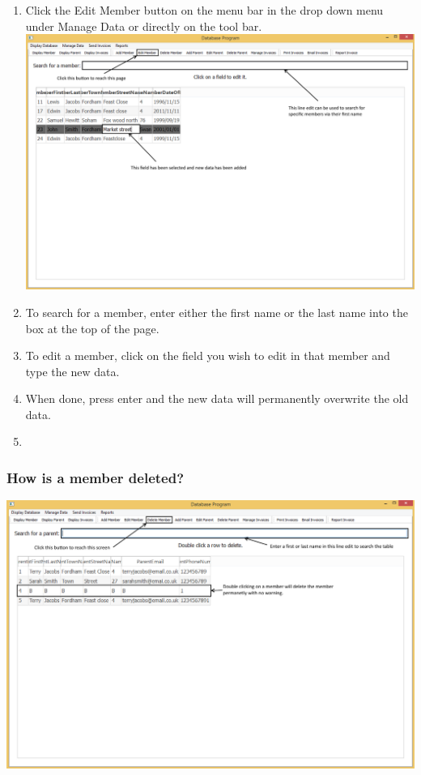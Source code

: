 \begin{enumerate}
	\item Click the Edit Member button on the menu bar in the drop down menu under Manage Data or directly on the tool bar.
\includegraphics[width=\textwidth]{./Manual/Images/EditMember.png}
	\item To search for a member, enter either the first name or the last name into the box at the top of the page.
	\item To edit a member, click on the field you wish to edit in that member and type the new data.
	\item When done, press enter and the new data will permanently overwrite the old data.
	\item 
\end{enumerate}

\subsubsection{How is a member deleted?}
\label{delete_member}

\includegraphics[width=\textwidth]{./Manual/Images/DeleteMember.png}

